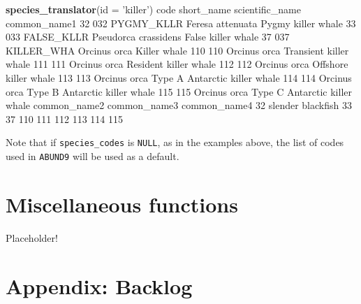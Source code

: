 \documentclass[
]{book}
\newenvironment{Shaded}{\begin{snugshade}}{\end{snugshade}}
\newcommand{\DataTypeTok}[1]{\textcolor[rgb]{0.13,0.29,0.53}{#1}}
\newcommand{\DecValTok}[1]{\textcolor[rgb]{0.00,0.00,0.81}{#1}}
\newcommand{\KeywordTok}[1]{\textcolor[rgb]{0.13,0.29,0.53}{\textbf{#1}}}
\newcommand{\NormalTok}[1]{#1}
\newcommand{\StringTok}[1]{\textcolor[rgb]{0.31,0.60,0.02}{#1}}
\begin{document}
\begin{Shaded}
\begin{Highlighting}[]
\KeywordTok{species_translator}\NormalTok{(}\DataTypeTok{id =} \StringTok{'killer'}\NormalTok{)}
\NormalTok{    code short_name      scientific_name                  common_name1}
\DecValTok{32}   \DecValTok{032}\NormalTok{ PYGMY_KLLR     Feresa attenuata            Pygmy killer whale}
\DecValTok{33}   \DecValTok{033}\NormalTok{ FALSE_KLLR Pseudorca crassidens            False killer whale}
\DecValTok{37}   \DecValTok{037}\NormalTok{ KILLER_WHA         Orcinus orca                  Killer whale}
\DecValTok{110}  \DecValTok{110}\NormalTok{                    Orcinus orca        Transient killer whale}
\DecValTok{111}  \DecValTok{111}\NormalTok{                    Orcinus orca         Resident killer whale}
\DecValTok{112}  \DecValTok{112}\NormalTok{                    Orcinus orca         Offshore killer whale}
\DecValTok{113}  \DecValTok{113}\NormalTok{                    Orcinus orca Type A Antarctic killer whale}
\DecValTok{114}  \DecValTok{114}\NormalTok{                    Orcinus orca Type B Antarctic killer whale}
\DecValTok{115}  \DecValTok{115}\NormalTok{                    Orcinus orca Type C Antarctic killer whale}
\NormalTok{         common_name2 common_name3 common_name4}
\DecValTok{32}\NormalTok{  slender blackfish                          }
\DecValTok{33}                                             
\DecValTok{37}                                             
\DecValTok{110}                                            
\DecValTok{111}                                            
\DecValTok{112}                                            
\DecValTok{113}                                            
\DecValTok{114}                                            
\DecValTok{115}                                            
\end{Highlighting}
\end{Shaded}

Note that if \texttt{species\_codes} is \texttt{NULL}, as in the examples above, the list of codes used in \texttt{ABUND9} will be used as a default.

\hypertarget{misc_functions}{%
\chapter{Miscellaneous functions}\label{misc_functions}}

Placeholder!

\hypertarget{backlog}{%
\chapter{Appendix: Backlog}\label{backlog}}
\end{document}
